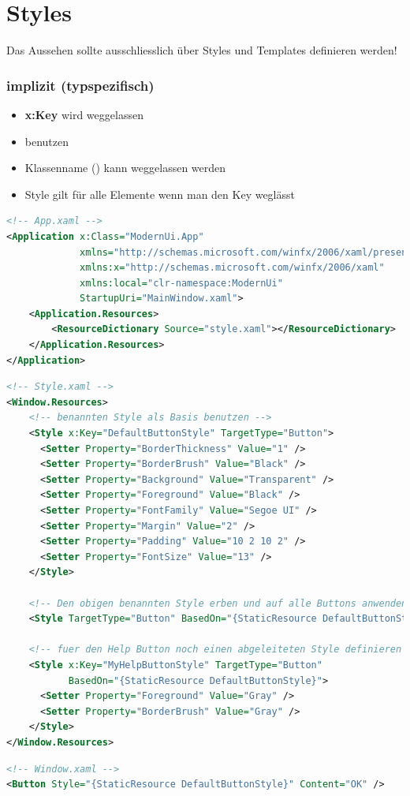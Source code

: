 \section{Styles}
Das Aussehen sollte ausschliesslich über Styles und Templates definieren werden! 
\subsubsection{implizit (typspezifisch)}
\begin{itemize}
    \item \textbf{x:Key} wird weggelassen
    \item {} benutzen
    \item Klassenname () kann weggelassen werden
    \item Style gilt für alle Elemente wenn man den Key weglässt
\end{itemize}
\begin{lstlisting}[language=xml]
<!-- App.xaml -->
<Application x:Class="ModernUi.App"
             xmlns="http://schemas.microsoft.com/winfx/2006/xaml/presentation"
             xmlns:x="http://schemas.microsoft.com/winfx/2006/xaml"
             xmlns:local="clr-namespace:ModernUi"
             StartupUri="MainWindow.xaml">
    <Application.Resources>
        <ResourceDictionary Source="style.xaml"></ResourceDictionary>
    </Application.Resources>
</Application>
\end{lstlisting}
\begin{lstlisting}[language=xml]
<!-- Style.xaml -->
<Window.Resources>
    <!-- benannten Style als Basis benutzen -->
    <Style x:Key="DefaultButtonStyle" TargetType="Button">
      <Setter Property="BorderThickness" Value="1" />
      <Setter Property="BorderBrush" Value="Black" />
      <Setter Property="Background" Value="Transparent" />
      <Setter Property="Foreground" Value="Black" />
      <Setter Property="FontFamily" Value="Segoe UI" />
      <Setter Property="Margin" Value="2" />
      <Setter Property="Padding" Value="10 2 10 2" />
      <Setter Property="FontSize" Value="13" />
    </Style>
    
    <!-- Den obigen benannten Style erben und auf alle Buttons anwenden -->
    <Style TargetType="Button" BasedOn="{StaticResource DefaultButtonStyle}"> </Style>
    
    <!-- fuer den Help Button noch einen abgeleiteten Style definieren --> 
    <Style x:Key="MyHelpButtonStyle" TargetType="Button"
           BasedOn="{StaticResource DefaultButtonStyle}">
      <Setter Property="Foreground" Value="Gray" />
      <Setter Property="BorderBrush" Value="Gray" />
    </Style>
</Window.Resources>
\end{lstlisting}
\begin{lstlisting}[language=xml]
<!-- Window.xaml -->
<Button Style="{StaticResource DefaultButtonStyle}" Content="OK" />
\end{lstlisting}


